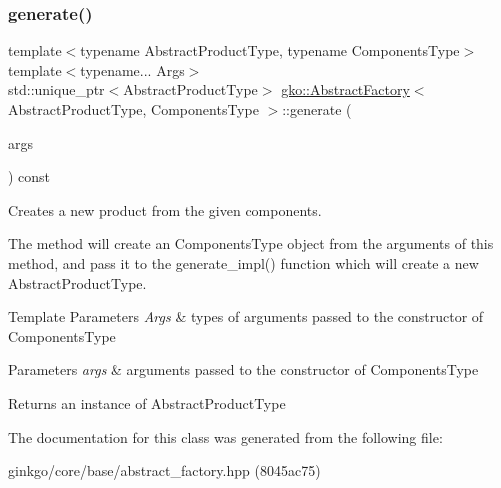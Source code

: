 \subsubsection{\texorpdfstring{generate()}{generate()}}
{\footnotesize\ttfamily template$<$typename Abstract\+Product\+Type, typename Components\+Type$>$ \\
template$<$typename... Args$>$ \\
std\+::unique\+\_\+ptr$<$Abstract\+Product\+Type$>$ \hyperlink{classgko_1_1AbstractFactory}{gko\+::\+Abstract\+Factory}$<$ Abstract\+Product\+Type, Components\+Type $>$\+::generate (\begin{DoxyParamCaption}\item[{Args \&\&...}]{args }\end{DoxyParamCaption}) const\hspace{0.3cm}{\ttfamily [inline]}}



Creates a new product from the given components. 

The method will create an Components\+Type object from the arguments of this method, and pass it to the generate\+\_\+impl() function which will create a new Abstract\+Product\+Type.


\begin{DoxyTemplParams}{Template Parameters}
{\em Args} & types of arguments passed to the constructor of Components\+Type\\
\hline
\end{DoxyTemplParams}

\begin{DoxyParams}{Parameters}
{\em args} & arguments passed to the constructor of Components\+Type\\
\hline
\end{DoxyParams}
\begin{DoxyReturn}{Returns}
an instance of Abstract\+Product\+Type 
\end{DoxyReturn}


The documentation for this class was generated from the following file\+:\begin{DoxyCompactItemize}
\item 
ginkgo/core/base/abstract\+\_\+factory.\+hpp (8045ac75)\end{DoxyCompactItemize}
